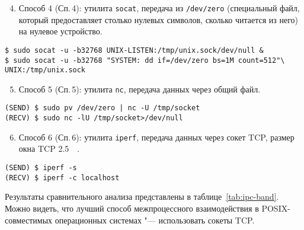 \begin{enumerate}
\setcounter{enumi}{3}
\item  Способ 4 (Сп.\,4): утилита \texttt{socat}, передача из \texttt{/dev/zero} (специальный файл, который предоставляет столько нулевых символов, сколько читается из него) на нулевое устройство.
\end{enumerate}

\noindent
\begin{lstlisting}
$ sudo socat -u -b32768 UNIX-LISTEN:/tmp/unix.sock/dev/null &
$ sudo socat -u -b32768 "SYSTEM: dd if=/dev/zero bs=1M count=512"\
UNIX:/tmp/unix.sock
\end{lstlisting}

\begin{enumerate}
\setcounter{enumi}{4}
\item  Способ 5 (Сп.\,5): утилита \texttt{nc}, передача данных через общий файл.
\end{enumerate}

\noindent
\begin{lstlisting}
(SEND) $ sudo pv /dev/zero | nc -U /tmp/socket
(RECV) $ sudo nc -lU /tmp/socket>/dev/null
\end{lstlisting}

\begin{enumerate}
\setcounter{enumi}{5}
\item  Способ 6 (Сп.\,6): утилита \texttt{iperf}, передача данных через сокет TCP, размер окна TCP \SI{2,5}{\mega\byte}.
\end{enumerate}

\noindent
\begin{lstlisting}
(SEND) $ iperf -s
(RECV) $ iperf -c localhost
\end{lstlisting}

Результаты сравнительного анализа представлены в таблице~\cref{tab:ipc-band}. Можно видеть, что лучший способ межпроцессного взаимодействия в POSIX-совместимых операционных системах "--- использовать сокеты TCP.

